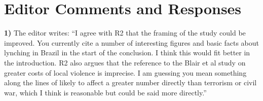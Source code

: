\documentclass[a4paper,12pt]{article}
\begin{document}
\newpage

\section*{Editor Comments and Responses}

\textbf{1)} The editor writes: ``I agree with R2 that the framing of the study
could be improved. You currently cite a number of interesting figures and basic
facts about lynching in Brazil in the start of the conclusion. I think this
would fit better in the introduction. R2 also argues that the reference to the
Blair et al study on greater costs of local violence is imprecise. I am
guessing you mean something along the lines of likely to affect a greater
number directly than terrorism or civil war, which I think is reasonable but
could be said more directly.''

\vspace{.3cm}
\end{document}
